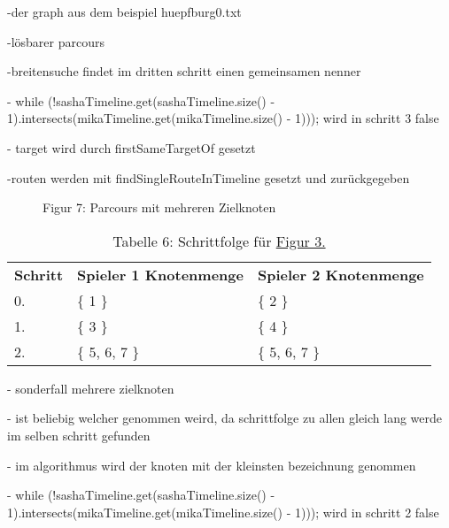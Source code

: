 \documentclass[a4paper,10pt,ngerman]{scrartcl}
\begin{document}
    -der graph aus dem beispiel huepfburg0.txt

    -lösbarer parcours

    -breitensuche findet im dritten schritt einen gemeinsamen nenner

    - while (!sashaTimeline.get(sashaTimeline.size() - 1).intersects(mikaTimeline.get(mikaTimeline.size() - 1))); wird in schritt 3 false

    - target wird durch firstSameTargetOf gesetzt

    -routen werden mit findSingleRouteInTimeline gesetzt und zurückgegeben

    \begin{figure}[h!]
        \centering
        \FigurSieben{}
        \caption{Figur 7: Parcours mit mehreren Zielknoten}
        \label{fig:Figure7}
    \end{figure}

    \begin{table}[h!]
        \centering
        \begin{tabular}{lll}
            \textbf{Schritt} & \textbf{Spieler 1 Knotenmenge} & \textbf{Spieler 2 Knotenmenge} \\
            0.               & \{ 1 \}                        & \{ 2 \}                        \\
            1.               & \{ 3 \}                        & \{  4 \}                         \\
            2.               & \{ 5, 6, 7 \}                  & \{ 5, 6, 7 \}                  \\
        \end{tabular}
        \caption{Tabelle 6: Schrittfolge für \hyperref[fig:Figure4]{Figur 3.}}
        \label{tab:Table6}
    \end{table}

    - sonderfall mehrere zielknoten

    - ist beliebig welcher genommen weird, da schrittfolge zu allen gleich lang
    werde im selben schritt gefunden

    - im algorithmus wird der knoten mit der kleinsten bezeichnung genommen

    - while (!sashaTimeline.get(sashaTimeline.size() - 1).intersects(mikaTimeline.get(mikaTimeline.size() - 1))); wird in schritt 2 false
\end{document}

